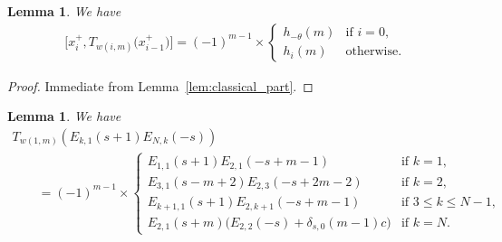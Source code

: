 \documentclass[11pt]{article}
\newtheorem{lem}[thm]{Lemma}
\theoremstyle{definition}
\numberwithin{equation}{section}
\begin{document}
\begin{lem}\label{lem:braket_pre}
We have
\begin{gather*} \big[x_{i}^+, T_{w(i,m)}\big(x_{i-1}^+\big)\big] = (-1)^{m-1} \times \begin{cases}
h_{-\theta}(m) & \text{if $i=0$},\\
h_i(m) & \text{otherwise}.
\end{cases}
\end{gather*}
\end{lem}

\begin{proof}
Immediate from Lemma~\ref{lem:classical_part}.
\end{proof}

\begin{lem}\label{lem:i=1}We have
\begin{gather*}
T_{w(1,m)}(E_{k,1}(s+1)E_{N,k}(-s)) \\
\qquad{} = (-1)^{m-1} \times\begin{cases}
E_{1,1}(s+1)E_{2,1}(-s+m-1) & \text{if $k=1$},\\
E_{3,1}(s-m+2)E_{2,3}(-s+2m-2) & \text{if $k=2$},\\
E_{k+1,1}(s+1)E_{2,k+1}(-s+m-1) & \text{if $3 \leq k \leq N-1$},\\
E_{2,1}(s+m)\Big( E_{2,2}(-s) + \delta_{s,0}(m-1)c \Big) & \text{if $k=N$}.
\end{cases}
\end{gather*}
\end{lem}
\end{document}
